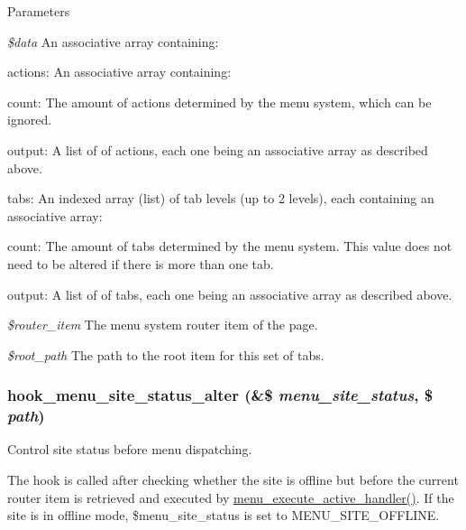 \begin{DoxyParams}{Parameters}
\item[{\em \$data}]An associative array containing:
\begin{DoxyItemize}
\item actions: An associative array containing:
\begin{DoxyItemize}
\item count: The amount of actions determined by the menu system, which can be ignored.
\item output: A list of of actions, each one being an associative array as described above.
\end{DoxyItemize}
\item tabs: An indexed array (list) of tab levels (up to 2 levels), each containing an associative array:
\begin{DoxyItemize}
\item count: The amount of tabs determined by the menu system. This value does not need to be altered if there is more than one tab.
\item output: A list of of tabs, each one being an associative array as described above. 
\end{DoxyItemize}
\end{DoxyItemize}\item[{\em \$router\_\-item}]The menu system router item of the page. \item[{\em \$root\_\-path}]The path to the root item for this set of tabs. \end{DoxyParams}
\hypertarget{group__hooks_ga3096be11aad61c8b342ade94789f6137}{
\subsubsection[{hook\_\-menu\_\-site\_\-status\_\-alter}]{\setlength{\rightskip}{0pt plus 5cm}hook\_\-menu\_\-site\_\-status\_\-alter (\&\$ {\em menu\_\-site\_\-status}, \/  \$ {\em path})}}
\label{group__hooks_ga3096be11aad61c8b342ade94789f6137}
Control site status before menu dispatching.

The hook is called after checking whether the site is offline but before the current router item is retrieved and executed by \hyperlink{group__menu_gae33bae24fcac6126aa272d1c437f947c}{menu\_\-execute\_\-active\_\-handler()}. If the site is in offline mode, \$menu\_\-site\_\-status is set to MENU\_\-SITE\_\-OFFLINE.



